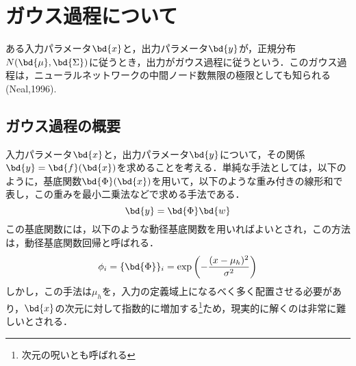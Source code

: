 \section{ガウス過程について}
ある入力パラメータ$ \bd{x} $と，出力パラメータ$ \bd{y} $が，正規分布$ N(\bd{\mu},\bd{\Sigma}) $に従うとき，出力がガウス過程に従うという．このガウス過程は，ニューラルネットワークの中間ノード数無限の極限としても知られる(Neal,1996).
	\subsection{ガウス過程の概要}
		入力パラメータ$ \bd{x} $と，出力パラメータ$ \bd{y} $について，その関係$ \bd{y} = \bd{f}(\bd{x})$を求めることを考える．単純な手法としては，以下のように，基底関数$ \bd{\Phi}(\bd{x}) $を用いて，以下のような重み付きの線形和で表し，この重みを最小二乗法などで求める手法である．
		\begin{equation}\label{eq:Ritz_ppoi}
			\bd{y} = \bd{\Phi}\bd{w}
		\end{equation}
		この基底関数には，以下のような動径基底関数を用いればよいとされ，この方法は，動径基底関数回帰と呼ばれる．
		\begin{equation}\label{eq:phieq}
			\phi_i = \{\bd{\Phi}\}_i = \exp\left(-\frac{(x-\mu_h)^2}{\sigma^2}\right)
		\end{equation}
		しかし，この手法は$ \mu_h $を，入力の定義域上になるべく多く配置させる必要があり，$ \bd{x} $の次元に対して指数的に増加する\footnote{次元の呪いとも呼ばれる}ため，現実的に解くのは非常に難しいとされる．
		
